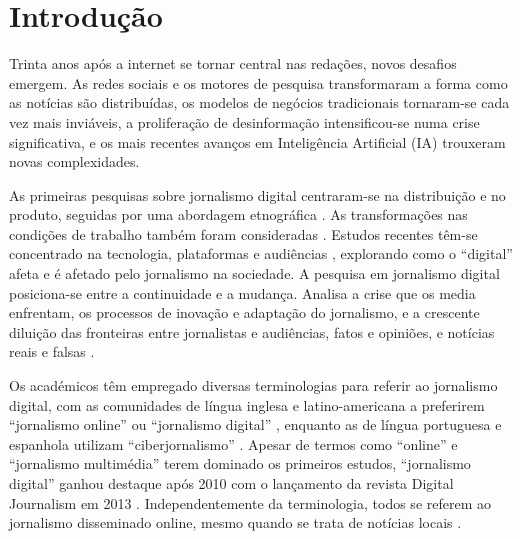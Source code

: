 \documentclass[portuguese]{textolivre}
\begin{document}
\begin{polyabstract}
\begin{english}
\begin{abstract}
\end{abstract}
\end{english}
\end{polyabstract}

\section{Introdução}

Trinta anos após a internet se tornar central nas redações, novos desafios emergem. As redes sociais e os motores de pesquisa transformaram a forma como as notícias são distribuídas, os modelos de negócios tradicionais tornaram-se cada vez mais inviáveis, a proliferação de desinformação intensificou-se numa crise significativa, e os mais recentes avanços em Inteligência Artificial (IA) trouxeram novas complexidades.

As primeiras pesquisas sobre jornalismo digital centraram-se na distribuição e no produto, seguidas por uma abordagem etnográfica \cite{jeronimo2015}. As transformações nas condições de trabalho também foram consideradas \cite{deuze2009, morais2020}. Estudos recentes têm-se concentrado na tecnologia, plataformas e audiências \cite{steensen2019}, explorando como o “digital” afeta e é afetado pelo jornalismo na sociedade. A pesquisa em jornalismo digital posiciona-se entre a continuidade e a mudança. Analisa a crise que os media enfrentam, os processos de inovação e adaptação do jornalismo, e a crescente diluição das fronteiras entre jornalistas e audiências, fatos e opiniões, e notícias reais e falsas \cite{eldridge2019, westlund2023}.

Os académicos têm empregado diversas terminologias para referir ao jornalismo digital, com as comunidades de língua inglesa e latino-americana a preferirem “jornalismo online” ou “jornalismo digital” \cite{boczkowski2004, westlund2023, eldridge2019}, enquanto as de língua portuguesa e espanhola utilizam “ciberjornalismo” \cite{bastos2023, jeronimo2015, diaz2003, lopez-garcia2008}. Apesar de termos como “online” e “jornalismo multimédia” terem dominado os primeiros estudos, “jornalismo digital” ganhou destaque após 2010 com o lançamento da revista Digital Journalism em 2013 \cite{steensen2019}. Independentemente da terminologia, todos se referem ao jornalismo disseminado online, mesmo quando se trata de notícias locais \cite{jeronimo2015}.
\end{document}
